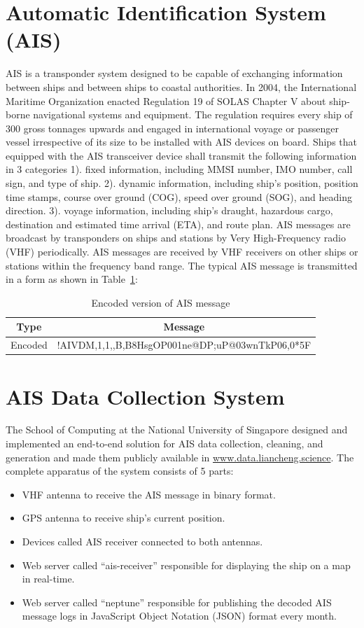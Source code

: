 \section{Automatic Identification System (AIS)}
AIS is a transponder system designed to be capable of exchanging information between ships and between ships to coastal authorities. In 2004, the International Maritime Organization enacted Regulation 19 of SOLAS Chapter V about ship-borne navigational systems and equipment. The regulation requires every ship of 300 gross tonnages upwards and engaged in international voyage or passenger vessel irrespective of its size to be installed with AIS devices on board. Ships that equipped with the AIS transceiver device shall transmit the following information in 3 categories 1). fixed information, including MMSI number, IMO number, call sign, and type of ship. 2). dynamic information, including ship's position, position time stamps, course over ground (COG), speed over ground (SOG), and heading direction. 3). voyage information, including ship's draught, hazardous cargo, destination and estimated time arrival (ETA), and route plan. AIS messages are broadcast by transponders on ships and stations by Very High-Frequency radio (VHF) periodically. AIS messages are received by VHF receivers on other ships or stations within the frequency band range. The typical AIS message is transmitted in a form as shown in Table~\ref{tab:ais_table}:

\begin{table}[ht]
\caption{Encoded version of AIS message}
\label{tab:ais_table}
\centering
\begin{tabular}{|c||c|}
\hline
Type & Message\\
\hline
Encoded & !AIVDM,1,1,,B,B8HsgOP001ne@DP;uP@03wnTkP06,0*5F\\
\hline
\end{tabular}
\end{table}

\section{AIS Data Collection System}
The School of Computing at the National University of Singapore designed and implemented an end-to-end solution for AIS data collection, cleaning, and generation and made them publicly available in \url{www.data.liancheng.science}. The complete apparatus of the system consists of 5 parts: 
\begin{itemize}
    \item VHF antenna to receive the AIS message in binary format.
    \item GPS antenna to receive ship's current position.
    \item Devices called AIS receiver connected to both antennas.
    \item Web server called ``ais-receiver'' responsible for displaying the ship on a map in real-time.
    \item Web server called ``neptune'' responsible for publishing the decoded AIS message logs in JavaScript Object Notation (JSON) format every month.
\end{itemize}

